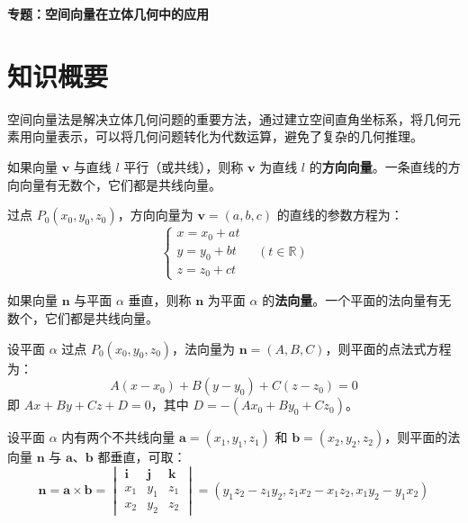 \documentclass[11pt]{ctexrep}
\begin{document}
\begin{center}
    {\LARGE\bfseries 专题：空间向量在立体几何中的应用}
\end{center}

\section*{知识概要}

空间向量法是解决立体几何问题的重要方法，通过建立空间直角坐标系，将几何元素用向量表示，可以将几何问题转化为代数运算，避免了复杂的几何推理。

\begin{definition}[直线的方向向量]
    如果向量 $\boldsymbol{v}$ 与直线 $l$ 平行（或共线），则称 $\boldsymbol{v}$ 为直线 $l$ 的\textbf{方向向量}。一条直线的方向向量有无数个，它们都是共线向量。
    
    过点 $P_0(x_0, y_0, z_0)$，方向向量为 $\boldsymbol{v} = (a, b, c)$ 的直线的参数方程为：
    \[
    \begin{cases}
    x = x_0 + at \\
    y = y_0 + bt \\
    z = z_0 + ct
    \end{cases} \quad (t \in \mathbb{R})
    \]
\end{definition}

\begin{definition}[平面的法向量]
    如果向量 $\boldsymbol{n}$ 与平面 $\alpha$ 垂直，则称 $\boldsymbol{n}$ 为平面 $\alpha$ 的\textbf{法向量}。一个平面的法向量有无数个，它们都是共线向量。
    
    设平面 $\alpha$ 过点 $P_0(x_0, y_0, z_0)$，法向量为 $\boldsymbol{n} = (A, B, C)$，则平面的点法式方程为：
    \[
    A(x - x_0) + B(y - y_0) + C(z - z_0) = 0
    \]
    即 $Ax + By + Cz + D = 0$，其中 $D = -(Ax_0 + By_0 + Cz_0)$。
\end{definition}

\begin{property}[法向量的求法]
    设平面 $\alpha$ 内有两个不共线向量 $\boldsymbol{a} = (x_1, y_1, z_1)$ 和 $\boldsymbol{b} = (x_2, y_2, z_2)$，则平面的法向量 $\boldsymbol{n}$ 与 $\boldsymbol{a}$、$\boldsymbol{b}$ 都垂直，可取：
    \[
    \boldsymbol{n} = \boldsymbol{a} \times \boldsymbol{b} = \begin{vmatrix} \boldsymbol{i} & \boldsymbol{j} & \boldsymbol{k} \\ x_1 & y_1 & z_1 \\ x_2 & y_2 & z_2 \end{vmatrix} = (y_1z_2 - z_1y_2, z_1x_2 - x_1z_2, x_1y_2 - y_1x_2)
    \]
\end{property}
\end{document}
